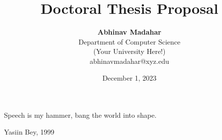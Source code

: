 \documentclass[12pt]{article}
\title{{\bf Doctoral Thesis Proposal}}
\author{ {\bf Abhinav Madahar}  \\
Department of Computer Science \\
(Your University Here!) \\
{\small abhinavmadahar@xyz.edu}
}
\date{December 1, 2023}
\begin{document}
\pagestyle{plain}
\maketitle

\pagebreak
\vspace*{\fill}
\noindent Speech is my hammer, bang the world into shape.

\noindent Yasiin Bey, 1999
\vspace*{\fill}

\pagebreak
\begin{abstract}

\end{abstract}

\pagebreak
\tableofcontents
\pagebreak

\cleardoublepage
{}


\begin{footnotesize}


\end{footnotesize}
\end{document}
